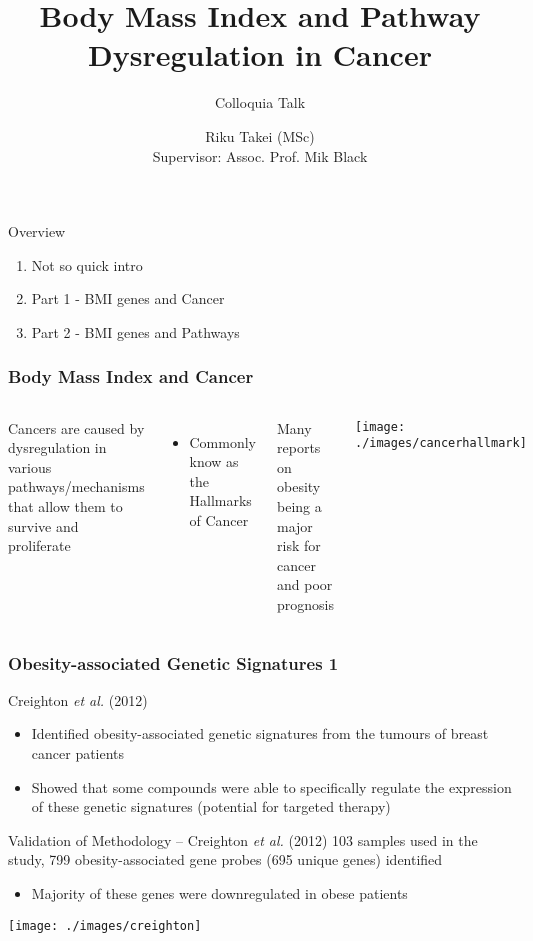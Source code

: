 \documentclass[handout]{beamer}
\title[BMI and Cancer]{Body Mass Index and Pathway Dysregulation in Cancer}
\subtitle{Colloquia Talk}
\author[Riku Takei]{Riku Takei (MSc)\\Supervisor: Assoc. Prof. Mik Black}
\institute{Department of Biochemistry, University of Otago}
\begin{document}
{
	\begin{frame}[noframenumbering]
		\titlepage
	\end{frame}
}

\begin{frame}{Overview}
	\begin{enumerate}
		\item Not so quick intro
		\item Part 1 - BMI genes and Cancer
		\item Part 2 - BMI genes and Pathways
	\end{enumerate}
\end{frame}

\begin{frame}
	\frametitle{Body Mass Index and Cancer}
	\begin{columns}
		{\footnotesize
			Cancers are caused by dysregulation in various pathways/mechanisms that allow them to survive and proliferate
			\begin{itemize}
				\item Commonly know as the Hallmarks of Cancer
			\end{itemize}
			Many reports on obesity being a major risk for cancer and poor prognosis
		}
		\texttt{[image: ./images/cancerhallmark]}
	\end{columns}
\end{frame}

\begin{frame}
	\frametitle{Obesity-associated Genetic Signatures 1}
	Creighton \textit{et al.} (2012)
	\begin{itemize}
		\item Identified obesity-associated genetic signatures from the tumours of breast cancer patients
		\item Showed that some compounds were able to specifically regulate the expression of these genetic signatures (potential for targeted therapy)
	\end{itemize}
\end{frame}

\begin{frame}{Validation of Methodology -- Creighton \textit{et al.} (2012)}
	103 samples used in the study, 799 obesity-associated gene probes (695 unique genes) identified\\
	{\footnotesize
		\begin{itemize}
			\item Majority of these genes were downregulated in obese patients
		\end{itemize}
	}
	\begin{center}
		\texttt{[image: ./images/creighton]}
	\end{center}
\end{frame}
\end{document}
